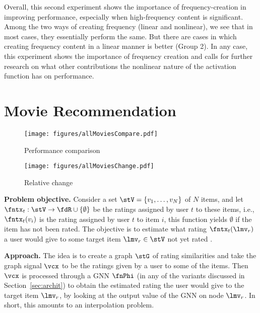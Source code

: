 Overall, this second experiment shows the importance of frequency-creation in improving performance, especially when high-frequency content is significant. Among the two ways of creating frequency (linear and nonlinear), we see that in most cases, they essentially perform the same. But there are cases in which creating frequency content in a linear manner is better (Group 2). In any case, this experiment shows the importance of frequency creation and calls for further research on what other contributions the nonlinear nature of the activation function has on performance.


\section{Movie Recommendation}

\begin{figure}
    \centering
    \texttt{[image: figures/allMoviesCompare.pdf]}
    \caption{Performance comparison}
    \label{fig:app:allMovies:compare}
\end{figure}
\begin{figure}
    \centering
    \texttt{[image: figures/allMoviesChange.pdf]}
    \caption{Relative change}
    \label{fig:app:allMovies:change}
\end{figure}

\textbf{Problem objective.} Consider a set $\stV = \{v_{1},\ldots,v_{N}\}$ of $N$ items, and let $\fntx_{t}: \stV \to \fdR \cup \{ \emptyset\}$ be the ratings assigned by user $t$ to these items, i.e., $\fntx_{t}(v_{i})$ is the rating assigned by user $t$ to item $i$, this function yields $\emptyset$ if the item has not been rated. The objective is to estimate what rating $\fntx_{t}(\lmv_{r})$ a user would give to some target item $\lmv_{r} \in \stV$ not yet rated \cite{Monti2017-RecommendationGNN, Levie2018-CayleyNets}.

\textbf{Approach.} The idea is to create a graph $\stG$ of rating similarities and take the graph signal $\vcx$ to be the ratings given by a user to some of the items. Then $\vcx$ is processed through a GNN $\fnPhi$ (in any of the variants discussed in Section~\ref{sec:archit}) to obtain the estimated rating the user would give to the target item $\lmv_{r}$, by looking at the output value of the GNN on node $\lmv_{r}$. In short, this amounts to an interpolation problem.


